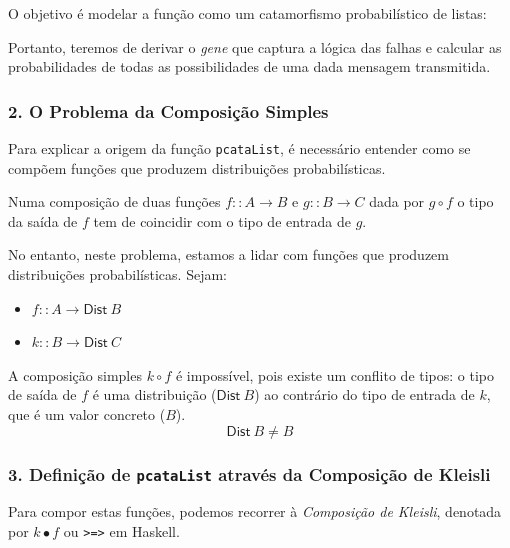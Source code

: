 \documentclass[11pt, a4paper, fleqn]{article}
\newcommand{\Conid}[1]{\mathit{#1}}
\newcommand{\Varid}[1]{\mathit{#1}}
\def\resethooks{%
  \global\let\SaveRestoreHook\empty
  \global\let\ColumnHook\empty}
\let\hspre\empty
\let\hspost\empty
\begin{document}
\noindent O objetivo é modelar a função como um catamorfismo probabilístico de listas:

\resethooks

\noindent Portanto, teremos de derivar o \emph{gene} que captura a lógica das falhas e calcular as probabilidades de todas as possibilidades de uma dada mensagem transmitida.

\subsubsection*{2. O Problema da Composição Simples}

\noindent Para explicar a origem da função \texttt{pcataList}, é necessário entender como se compõem funções que produzem distribuições probabilísticas.

\noindent Numa composição de duas funções $f :: A \to B$ e $g :: B \to C$ dada por $g \circ f$ o tipo da saída de $f$ tem de coincidir com o tipo de entrada de $g$.

\noindent No entanto, neste problema, estamos a lidar com funções que produzem distribuições probabilísticas. Sejam:
\begin{itemize}
    \item $f :: A \to \mathsf{Dist}\ B$
    \item $k :: B \to \mathsf{Dist}\ C$
\end{itemize}

\noindent A composição simples $k \circ f$ é impossível, pois existe um conflito de tipos: o tipo de saída de $f$ é uma distribuição ($\mathsf{Dist}\ B$) ao contrário do tipo de entrada de $k$, que é um valor concreto ($B$).
$$ \mathsf{Dist}\ B \neq B $$

\subsubsection*{3. Definição de \texttt{pcataList} através da Composição de Kleisli}

\noindent Para compor estas funções, podemos recorrer à \emph{Composição de Kleisli}, denotada por $k \bullet f$ ou \texttt{>=>} em Haskell.
\end{document}
